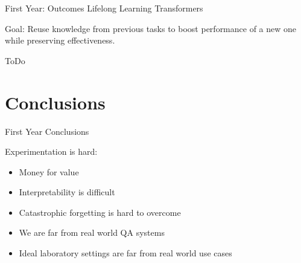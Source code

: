 \documentclass{beamer}
\begin{document}

\begin{frame}{First Year: Outcomes}
  \alert{\Large Lifelong Learning Transformers} \par

  \alert{Goal:} Reuse knowledge from previous tasks to boost performance of a new one while preserving effectiveness.
  
  \alert{ToDo}
\end{frame}

\note[itemize]{%
}

\section{Conclusions}
\begin{frame}{First Year Conclusions}
  \begin{alertblock}{Experimentation is hard:}
    \begin{itemize}
      \item Money for value
      \item Interpretability is difficult
      \item Catastrophic forgetting is hard to overcome
      \item We are far from real world QA systems
      \item Ideal laboratory settings are far from real world use cases
    \end{itemize}
  \end{alertblock}
\end{frame}

\end{document}
